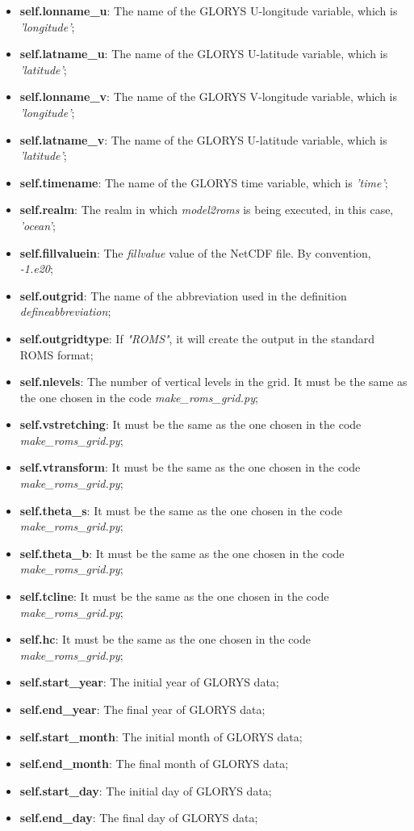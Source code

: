 \begin{itemize}
    \item \textbf{self.lonname\_u}: The name of the GLORYS U-longitude variable, which is \textit{'longitude'};
    \item \textbf{self.latname\_u}: The name of the GLORYS U-latitude variable, which is \textit{'latitude'};
    \item \textbf{self.lonname\_v}: The name of the GLORYS V-longitude variable, which is \textit{'longitude'};
    \item \textbf{self.latname\_v}: The name of the GLORYS U-latitude variable, which is \textit{'latitude'};
    \item \textbf{self.timename}: The name of the GLORYS time variable, which is \textit{'time'};
    \item \textbf{self.realm}: The realm in which \textit{model2roms} is being executed, in this case, \textit{'ocean'};
    \item \textbf{self.fillvaluein}: The \textit{fillvalue} value of the NetCDF file. By convention, \textit{-1.e20};
    \item \textbf{self.outgrid}: The name of the abbreviation used in the definition \textit{defineabbreviation};
    \item \textbf{self.outgridtype}: If \textit{"ROMS"}, it will create the output in the standard ROMS format;
    \item \textbf{self.nlevels}: The number of vertical levels in the grid. It must be the same as the one chosen in the code \textit{make\_roms\_grid.py};
    \item \textbf{self.vstretching}: It must be the same as the one chosen in the code \textit{make\_roms\_grid.py};
    \item \textbf{self.vtransform}: It must be the same as the one chosen in the code \textit{make\_roms\_grid.py};
    \item \textbf{self.theta\_s}: It must be the same as the one chosen in the code \textit{make\_roms\_grid.py};
    \item \textbf{self.theta\_b}: It must be the same as the one chosen in the code \textit{make\_roms\_grid.py};
    \item \textbf{self.tcline}: It must be the same as the one chosen in the code \textit{make\_roms\_grid.py};   
    \item \textbf{self.hc}: It must be the same as the one chosen in the code \textit{make\_roms\_grid.py};
    \item \textbf{self.start\_year}: The initial year of GLORYS data;
    \item \textbf{self.end\_year}: The final year of GLORYS data;
    \item \textbf{self.start\_month}: The initial month of GLORYS data;
    \item \textbf{self.end\_month}: The final month of GLORYS data;
    \item \textbf{self.start\_day}: The initial day of GLORYS data;
    \item \textbf{self.end\_day}: The final day of GLORYS data;
\end{itemize}
\bigskip

